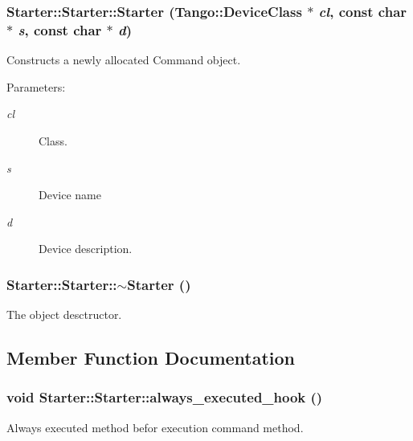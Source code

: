 \subsubsection{\setlength{\rightskip}{0pt plus 5cm}Starter::Starter::Starter (Tango::Device\-Class $\ast$ {\em cl}, const char $\ast$ {\em s}, const char $\ast$ {\em d})}\label{classStarter_1_1Starter_z2_2}


Constructs a newly allocated Command object.

\begin{Desc}
\item[Parameters: ]\par
\begin{description}
\item[{\em 
cl}]Class. \item[{\em 
s}]Device name \item[{\em 
d}]Device description. \end{description}
\end{Desc}
\subsubsection{\setlength{\rightskip}{0pt plus 5cm}Starter::Starter::$\sim$Starter ()\hspace{0.3cm}{\tt  [inline]}}\label{classStarter_1_1Starter_z3_0}


The object desctructor.



\subsection{Member Function Documentation}
\subsubsection{\setlength{\rightskip}{0pt plus 5cm}void Starter::Starter::always\_\-executed\_\-hook ()\hspace{0.3cm}{\tt  [virtual]}}\label{classStarter_1_1Starter_z4_1}


Always executed method befor execution command method.

